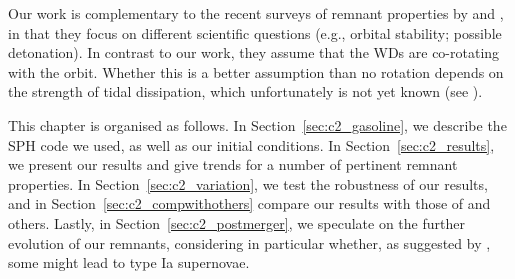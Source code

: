 Our work is complementary to the recent surveys of remnant properties by \cite{rask+12} and \cite{dan+12}, in that they focus on different scientific questions (e.g., orbital stability; possible detonation).  In contrast to our work, they assume that the WDs are co-rotating with the orbit.  Whether this is a better assumption than no rotation depends on the strength of tidal dissipation, which unfortunately is not yet known (see \citealt{marsns04,fulll12}).

This chapter is organised as follows.  In Section~\ref{sec:c2_gasoline}, we describe the SPH code we used, as well as our initial conditions.  In Section~\ref{sec:c2_results}, we present our results and give trends for a number of pertinent remnant properties.  In Section~\ref{sec:c2_variation}, we test the robustness of our results, and in Section~\ref{sec:c2_compwithothers} compare our results with those of \citeal{loreig09} and others.  Lastly, in Section~\ref{sec:c2_postmerger}, we speculate on the further evolution of our remnants, considering in particular whether, as suggested by \citeal{vkercj10}, some might lead to type Ia supernovae.

